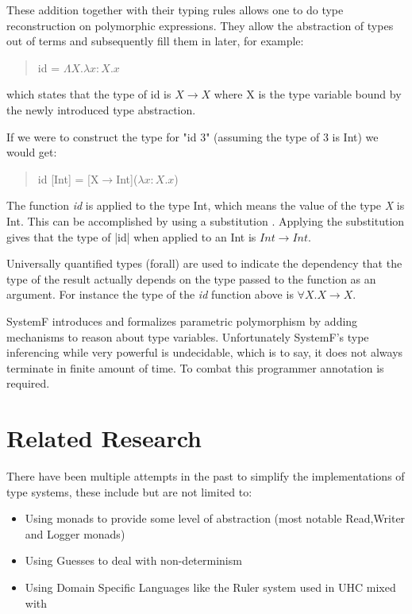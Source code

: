 These addition together with their typing rules allows one to do type reconstruction on polymorphic expressions. They allow the abstraction of types out of terms and subsequently fill them in later, for example:
\begin{quotation}
id = $\Lambda X.\lambda x:X. x$
\end{quotation}
which states that the type of id is $X \rightarrow X$ where X is the type variable bound by the newly introduced type abstraction. 

If we were to construct the type for "id 3" (assuming the type of 3 is Int) we would get:

\begin{quotation}
id [Int] = [X$\rightarrow$Int]($\lambda x:X. x$)
\end{quotation}

The function \emph{id} is applied to the type Int, which means the value of the type \emph{X} is Int. This can be accomplished by using a substitution . Applying the substitution gives that the type of |id| when applied to an Int is $Int \rightarrow Int$.

Universally quantified types (forall) are used to indicate the dependency that the type of the result actually depends on the type passed to the function as an argument. For instance the type of the \textit{id} function above is $\forall X. X\rightarrow X$.

SystemF introduces and formalizes parametric polymorphism by adding mechanisms to reason about type variables. Unfortunately SystemF's type inferencing while very powerful is undecidable, which is to say, it does not always terminate in finite amount of time. To combat this programmer annotation is required.

\section{Related Research}
There have been multiple attempts in the past to simplify the implementations of type systems, these include but are not limited to:

\begin{itemize}
\item Using monads\cite{Monads} to provide some level of abstraction (most notable Read,Writer and Logger monads)
\item Using Guesses\cite{Guesses} to deal with non-determinism 
\item Using Domain Specific Languages like the Ruler\cite{Ruler} system used in UHC mixed with \ags
\end{itemize}

